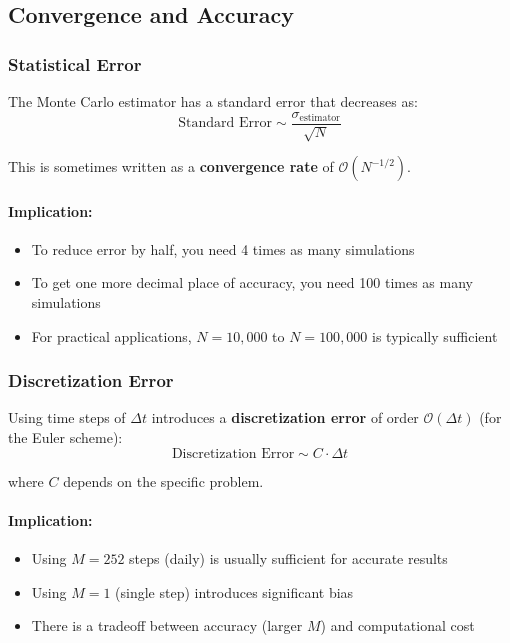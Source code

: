 \documentclass[12pt,a4paper]{article}
\begin{document}
\subsection{Convergence and Accuracy}

\subsubsection{Statistical Error}

The Monte Carlo estimator has a standard error that decreases as:
\begin{equation}
\text{Standard Error} \sim \frac{\sigma_{\text{estimator}}}{\sqrt{N}}
\end{equation}

This is sometimes written as a \textbf{convergence rate} of $\mathcal{O}(N^{-1/2})$.

\paragraph{Implication:}
\begin{itemize}
    \item To reduce error by half, you need 4 times as many simulations
    \item To get one more decimal place of accuracy, you need 100 times as many simulations
    \item For practical applications, $N = 10,000$ to $N = 100,000$ is typically sufficient
\end{itemize}

\subsubsection{Discretization Error}

Using time steps of $\Delta t$ introduces a \textbf{discretization error} of order $\mathcal{O}(\Delta t)$ (for the Euler scheme):
\begin{equation}
\text{Discretization Error} \sim C \cdot \Delta t
\end{equation}

where $C$ depends on the specific problem.

\paragraph{Implication:}
\begin{itemize}
    \item Using $M = 252$ steps (daily) is usually sufficient for accurate results
    \item Using $M = 1$ (single step) introduces significant bias
    \item There is a tradeoff between accuracy (larger $M$) and computational cost
\end{itemize}
\end{document}
